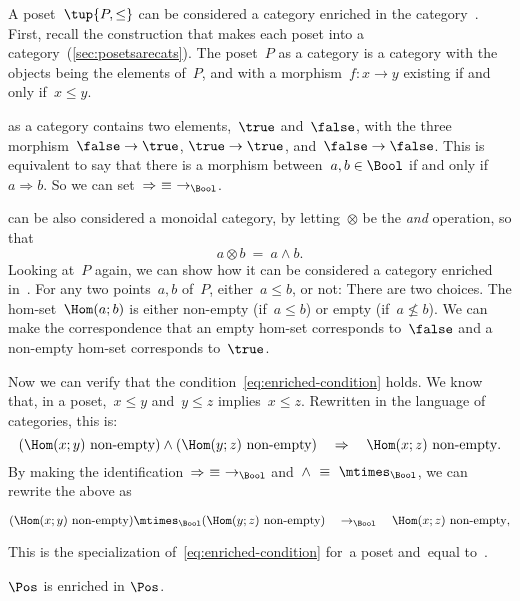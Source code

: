 \begin{example}
    A poset~$\tup{P, \leq}$ can be considered a category enriched in the category~\Bool.
    First, recall the construction that makes each poset into a category~(\cref{sec:posetsarecats}).
    The poset~$P$ as a category is a category with the objects being the elements of~$P$, and with a morphism~$f\colon x \to y$ existing if and only if~$x\leq y$.

    \Bool as a category contains two elements,~$\true$ and~$\false$, with
    the three morphism~$\false \to \true$, $\true \to \true$, and~$\false \to \false$.
    This is equivalent to say that there is a morphism between~$a, b \in \Bool$ if and only if~$a \Rightarrow b$.
    So we can set~$\Rightarrow\ \equiv\ \to_{\Bool}$.

    \Bool can be also considered a monoidal category, by letting~$\otimes$ be
    the \emph{and} operation, so that
    \begin{equation}
        a \otimes b\ =\ a \wedge b.
    \end{equation}
    Looking at~$P$ again, we can show how it can be considered a category enriched in~\Bool.
    For any two points~$a, b$ of~$P$, either~$a \leq b$, or not: There are two choices.
    The hom-set~$\Hom(a; b)$ is either non-empty (if~$a \leq b$) or empty (if~$a \not\leq b$).
    We can make the correspondence that an empty hom-set corresponds to~$\false$ and a non-empty hom-set corresponds to~$\true$.

    Now we can verify that the condition~\cref{eq:enriched-condition} holds.
    We know that, in a poset,~$x \leq y$ and~$y \leq z$ implies~$x \leq z$.
    Rewritten in the language of categories, this is:
    \begin{equation*}
        (\Hom(x;y)\ \text{non-empty})
        \wedge
        (\Hom(y; z)\ \text{non-empty})
        \quad
        \Rightarrow
        \quad
        \Hom(x; z)\ \text{non-empty}.
    \end{equation*}
    By making the identification~$\Rightarrow\ \equiv\ \to_{\Bool}$ and~$\wedge\ \equiv\ \mtimes_{\Bool}$, we can rewrite the above as
    \begin{widepar}
        \begin{equation*}
            (\Hom(x;y)\ \text{non-empty})
            \mtimes_{\Bool}
            (\Hom(y; z)\ \text{non-empty})
            \quad
            \to_{\Bool}
            \quad
            \Hom(x; z)\ \text{non-empty},
        \end{equation*}
    \end{widepar}
    This is the specialization of~\cref{eq:enriched-condition}
    for~\CatC a poset and~\CatD equal to~\Bool.
\end{example}
\begin{example}
    $\Pos$ is enriched in $\Pos$.
\end{example}

